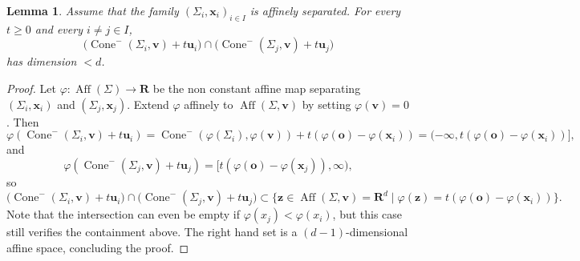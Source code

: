 \documentclass[10pt]{amsart}
\newcommand{\R}{\mathbf{R}}
\newcommand{\aff}{\operatorname{Aff}}
\newcommand{\ocone}[2]{\operatorname{Cone}^-(#1,#2)}
\newtheorem{lemma}[theorem]{Lemma}
\begin{document}
\begin{lemma}\label{lemma: non intersection}
Assume that the family $(\Sigma_i,\mathbf{x}_i)_{i \in I}$ is affinely separated. For every $t\geq 0$ and every $i \neq j \in I$,
\begin{equation*}%
    \Big(\ocone{\Sigma_i}{\mathbf{v}} + t \mathbf{u}_i\Big) \cap \Big(\ocone{\Sigma_j}{\mathbf{v}} + t \mathbf{u}_j\Big)
\end{equation*}
has dimension $<d$.
\end{lemma}
\begin{proof}
Let $\varphi: \aff(\Sigma) \to \R$ be the non constant affine map separating $(\Sigma_i,\mathbf{x}_i)$ and $(\Sigma_j,\mathbf{x}_j)$. Extend $\varphi$ affinely to  $\aff(\Sigma,\mathbf{v})$ by setting $\varphi(\mathbf{v})=0$. Then 
\[ \varphi(\ocone{\Sigma_i}{\mathbf{v}} + t \mathbf{u}_i) = \ocone{\varphi(\Sigma_i)}{\varphi(\mathbf{v})} + t (\varphi(\mathbf{o}) - \varphi(\mathbf{x}_i)) = (-\infty,t (\varphi(\mathbf{o}) - \varphi(\mathbf{x}_i))],\]
and 
\[ \varphi(\ocone{\Sigma_j}{\mathbf{v}} + t \mathbf{u}_j) = [t (\varphi(\mathbf{o}) - \varphi(\mathbf{x}_j)),\infty),\]
so \[
  \Big(\ocone{\Sigma_i}{\mathbf{v}} + t \mathbf{u}_i\Big) \cap \Big(\ocone{\Sigma_j}{\mathbf{v}} + t \mathbf{u}_j\Big) \subset \{ \mathbf{z} \in \aff(\Sigma,\mathbf{v})=\R^d \mid \varphi(\mathbf{z})=t(\varphi(\mathbf{o}) - \varphi(\mathbf{x}_i))\}.\]
  Note that the intersection can even be empty if $\varphi(x_j)<\varphi(x_i)$, but this case still verifies the containment above. The right hand set is a $(d-1)$-dimensional affine space, concluding the proof.
\end{proof}
\end{document}
